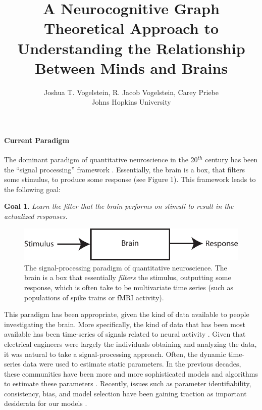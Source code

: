 
\usepackage{algorithmic}
\usepackage{algorithm}

\newtheorem{goal}{Goal}
\newtheorem{desid}{Desiderata}
\newcommand{\zz}{\mathbb{Z}}
\newcommand{\nec}{NeCoG}


\title{A Neurocognitive Graph Theoretical Approach to Understanding the Relationship Between Minds and Brains}

\author{Joshua T. Vogelstein, R. Jacob Vogelstein, Carey Priebe\\{Johns Hopkins University}}



\maketitle

\paragraph{Current Paradigm}

The dominant paradigm of quantitative neuroscience in the 20$^{th}$ century has been the ``signal processing'' framework \cite{}.  Essentially, the brain is a box, that filters some stimulus, to produce some response (see Figure 1). This framework leads to the following goal:

\begin{goal}
	Learn the filter that the brain performs on stimuli to result in the actualized responses.
\end{goal}

\begin{figure}[h!]
\centering \includegraphics{stim_brain_resp}
\caption{The signal-processing paradigm of quantitative neuroscience.  The brain is a box that essentially \emph{filters} the stimulus, outputting some response, which is often take to be multivariate time series (such as populations of spike trains or fMRI activity).} \label{fig:SBR}
\end{figure}


This paradigm has been appropriate, given the kind of data available to people investigating the brain.  More specifically, the kind of data that has been most available has been time-series of signals related to neural activity \cite{}.  Given that electrical engineers were largely the individuals obtaining and analyzing the data, it was natural to take a signal-processing approach.  Often, the dynamic time-series data were used to estimate static parameters.  In the previous decades, these communities have been more and more sophisticated models and algorithms to estimate these parameters \cite{}.  Recently, issues such as parameter identifiability, consistency, bias, and model selection have been gaining traction as important desiderata for our models \cite{}.  

